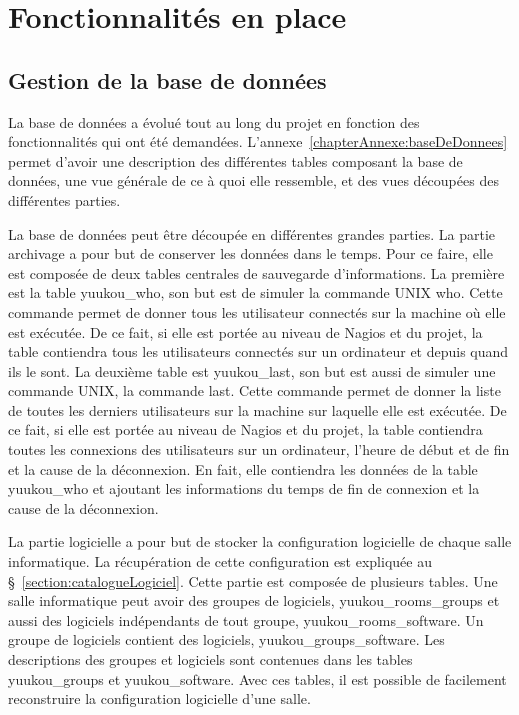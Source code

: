 \section{Fonctionnalit\'es en place}

\subsection{Gestion de la base de donn\'ees}

La base de donn\'ees a \'evolu\'e tout au long du projet en fonction des fonctionnalit\'es qui ont \'et\'e demand\'ees.
L'annexe~\ref{chapterAnnexe:baseDeDonnees} permet d'avoir une description des diff\'erentes tables composant la base de donn\'ees, une vue g\'en\'erale de ce \`a quoi elle ressemble, et des vues d\'ecoup\'ees des diff\'erentes parties.

La base de donn\'ees peut \^etre d\'ecoup\'ee en diff\'erentes grandes parties.
La partie archivage a pour but de conserver les donn\'ees dans le temps.
Pour ce faire, elle est compos\'ee de deux tables centrales de sauvegarde d'informations.
La premi\`ere est la table \textsf{yuukou\_who}, son but est de simuler la commande UNIX \textsf{who}.
Cette commande permet de donner tous les utilisateur connect\'es sur la machine o\`u elle est ex\'ecut\'ee.
De ce fait, si elle est port\'ee au niveau de Nagios et du projet, la table contiendra tous les utilisateurs connect\'es sur un ordinateur et depuis quand ils le sont.
La deuxi\`eme table est \textsf{yuukou\_last}, son but est aussi de simuler une commande UNIX, la commande \textsf{last}.
Cette commande permet de donner la liste de toutes les derniers utilisateurs sur la machine sur laquelle elle est ex\'ecut\'ee.
De ce fait, si elle est port\'ee au niveau de Nagios et du projet, la table contiendra toutes les connexions des utilisateurs sur un ordinateur, l'heure de d\'ebut et de fin et la cause de la d\'econnexion. En fait, elle contiendra les donn\'ees de la table \textsf{yuukou\_who} et ajoutant les informations du temps de fin de connexion et la cause de la d\'econnexion.

La partie logicielle a pour but de stocker la configuration logicielle de chaque salle informatique.
La r\'ecup\'eration de cette configuration est expliqu\'ee au \S~\ref{section:catalogueLogiciel}.
Cette partie est compos\'ee de plusieurs tables.
Une salle informatique peut avoir des groupes de logiciels, \textsf{yuukou\_rooms\_groups} et aussi des logiciels ind\'ependants de tout groupe, \textsf{yuukou\_rooms\_software}.
Un groupe de logiciels contient des logiciels, \textsf{yuukou\_groups\_software}.
Les descriptions des groupes et logiciels sont contenues dans les tables \textsf{yuukou\_groups} et \textsf{yuukou\_software}.
Avec ces tables, il est possible de facilement reconstruire la configuration logicielle d'une salle.

